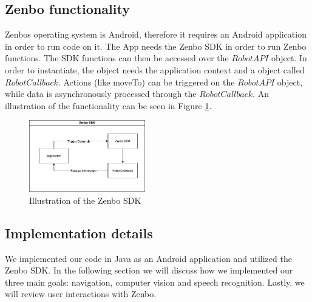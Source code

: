 \documentclass[conference]{IEEEtran}
\begin{document}
\subsection{Zenbo functionality}
Zenbos operating system is Android, therefore it requires an Android application in order to run code on it.
The App needs the Zenbo SDK in order to run Zenbo functions. 
The SDK functions can then be accessed over the $RobotAPI$ object. 
In order to instantiate, the object needs the application context and a object called $RobotCallback$.
Actions (like moveTo) can be triggered on the $RobotAPI$ object, while data is asynchronously processed 
through the $RobotCallback$. An illustration of the functionality can be seen in Figure \ref{fig:zenboSDK}. 
\begin{figure}  \label{fig:zenboSDK}
	\begin{center}
		\includegraphics[width=0.45\textwidth]{pics/zenboSDK.jpg}
	\end{center}
	\caption{Illustration of the Zenbo SDK}
\end{figure}
\subsection{Implementation details}
We implemented our code in Java as an Android application and utilized the Zenbo SDK. In the following section
we will discuss how we implemented our three main goals: navigation, computer vision and speech recognition.
Lastly, we will review user interactions with Zenbo.\\
\end{document}
